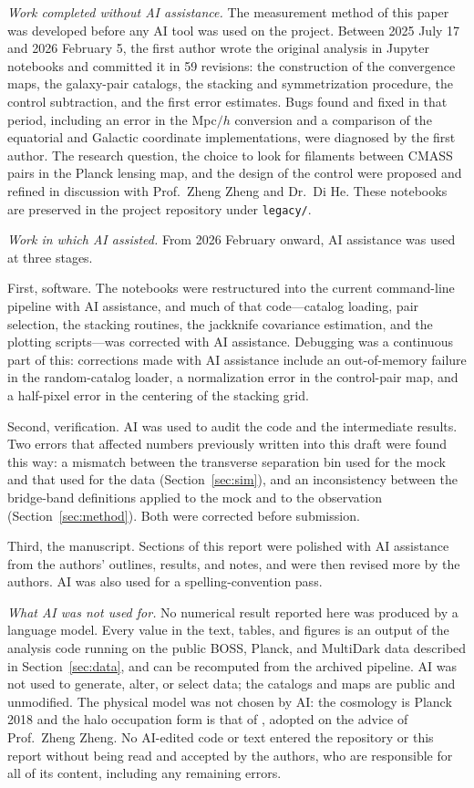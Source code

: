 \documentclass[preprint]{aastex701}
\begin{document}
\begin{acknowledgments}
\emph{Work completed without AI assistance.} The measurement method of this
paper was developed before any AI tool was used on the project. Between
2025 July 17 and 2026 February 5, the first author wrote the original analysis
in Jupyter notebooks and committed it in 59 revisions: the construction of the
convergence maps, the galaxy-pair catalogs, the stacking and symmetrization
procedure, the control subtraction, and the first error estimates. Bugs found
and fixed in that period, including an error in the Mpc$/h$ conversion and a
comparison of the equatorial and Galactic coordinate implementations, were
diagnosed by the first author. The research question, the choice to look for
filaments between CMASS pairs in the Planck lensing map, and the design of the
control were proposed and refined in discussion with Prof.\ Zheng Zheng and
Dr.\ Di He. These notebooks are preserved in the project repository under
\texttt{legacy/}.

\emph{Work in which AI assisted.} From 2026 February onward, AI assistance was
used at three stages.

First, software. The notebooks were restructured into the current command-line
pipeline with AI assistance, and much of that code---catalog loading, pair
selection, the stacking routines, the jackknife covariance estimation, and the
plotting scripts---was corrected with AI assistance. Debugging was a continuous
part of this: corrections made with AI assistance include an out-of-memory failure
in the random-catalog loader, a normalization error in the control-pair map, and a
half-pixel error in the centering of the stacking grid.

Second, verification. AI was used to audit the code and the intermediate
results. Two errors that affected numbers previously written into this draft
were found this way: a mismatch between the transverse separation bin used for
the mock and that used for the data (Section~\ref{sec:sim}), and an
inconsistency between the bridge-band definitions applied to the mock and to
the observation (Section~\ref{sec:method}). Both were corrected before
submission.

Third, the manuscript. Sections of this report were polished with AI assistance
from the authors' outlines, results, and notes, and were then revised more by the
authors. AI was also used for a spelling-convention pass.

\emph{What AI was not used for.} No numerical result reported here was produced
by a language model. Every value in the text, tables, and figures is an output
of the analysis code running on the public BOSS, Planck, and MultiDark data
described in Section~\ref{sec:data}, and can be recomputed from the archived
pipeline. AI was not used to generate, alter, or select data; the catalogs and
maps are public and unmodified. The physical model was not chosen by AI: the
cosmology is Planck 2018 and the halo occupation form is that of
\citet{White2011}, adopted on the advice of Prof.\ Zheng Zheng. No AI-edited
code or text entered the repository or this report without being read and
accepted by the authors, who are responsible for all of its content, including
any remaining errors.


\end{acknowledgments}
\end{document}

